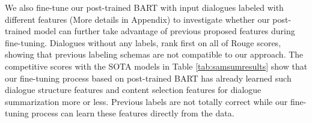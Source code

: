 We also fine-tune our post-trained BART with input dialogues labeled with different features (More details in Appendix) to investigate whether our post-trained model can further take advantage of previous proposed features during fine-tuning.
Dialogues without any labels, rank first on all of Rouge scores, showing that previous labeling schemas are not compatible to our approach. The competitive scores with the SOTA models in Table \ref{tab:samsumresults} show that our fine-tuning process based on post-trained BART has already learned such dialogue structure features and content selection features for dialogue summarization more or less. Previous labels are not totally correct while our fine-tuning process can learn these features directly from the data.



